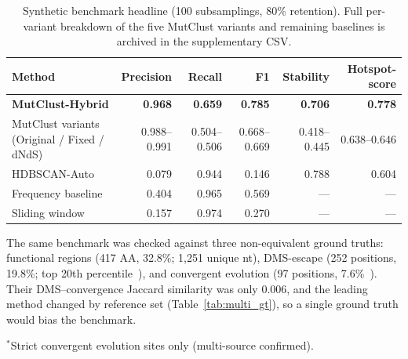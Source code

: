 \begin{table}[htbp]
\centering
\caption{Synthetic benchmark headline (100 subsamplings, 80\% retention). Full per-variant breakdown of the five MutClust variants and remaining baselines is archived in the supplementary CSV.}
\label{tab:hotspot_scores}
\small
\begin{tabular}{lrrrrr}
\toprule
\textbf{Method} & \textbf{Precision} & \textbf{Recall} & \textbf{F1} & \textbf{Stability} & \textbf{Hotspot-score} \\
\midrule
\textbf{MutClust-Hybrid} & \textbf{0.968} & \textbf{0.659} & \textbf{0.785} & \textbf{0.706} & \textbf{0.778} \\
MutClust variants (Original / Fixed / dNdS) & 0.988--0.991 & 0.504--0.506 & 0.668--0.669 & 0.418--0.445 & 0.638--0.646 \\
HDBSCAN-Auto & 0.079 & 0.944 & 0.146 & 0.788 & 0.604 \\
Frequency baseline & 0.404 & 0.965 & 0.569 & --- & --- \\
Sliding window & 0.157 & 0.974 & 0.270 & --- & --- \\
\bottomrule
\end{tabular}
\end{table}

The same benchmark was checked against three non-equivalent ground truths: functional regions (417 AA, 32.8\%; 1,251 unique nt), DMS-escape (252 positions, 19.8\%; top 20th percentile~\cite{dadonaite2023dms}), and convergent evolution (97 positions, 7.6\%~\cite{cao2023ba286,carabelli2023convergent}). Their DMS--convergence Jaccard similarity was only 0.006, and the leading method changed by reference set (Table~\ref{tab:multi_gt}), so a single ground truth would bias the benchmark.

\begin{table}[htbp]
\centering
\caption{Method comparison across multiple ground truths}
\label{tab:multi_gt}
\begin{minipage}{\textwidth}
\smallskip
\footnotesize $^*$Strict convergent evolution sites only (multi-source confirmed).
\end{minipage}
\end{table}

